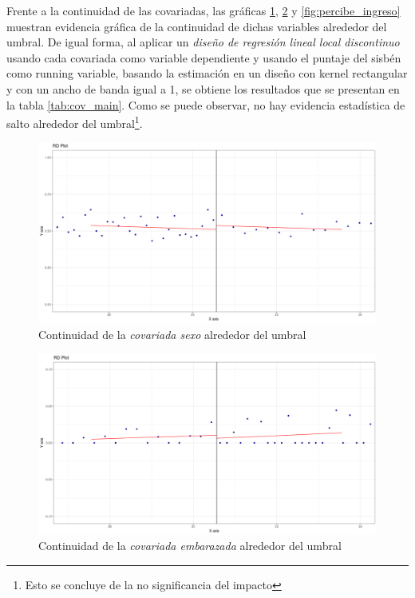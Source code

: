 \documentclass[AER]{AEA}
\begin{document}
Frente a la continuidad de las covariadas, las gráficas \ref{fig:sexo}, \ref{fig:embarazada} y \ref{fig:percibe_ingreso} muestran evidencia gráfica de la continuidad de dichas variables alrededor del umbral. De igual forma, al aplicar un \textit{diseño de regresión lineal local discontinuo} usando cada covariada como variable dependiente y usando el puntaje del sisbén como running variable, basando la estimación en un diseño con kernel rectangular y con un ancho de banda igual a 1, se obtiene los resultados que se presentan en la tabla \ref{tab:cov_main}. Como se puede observar, no hay evidencia estadística de salto alrededor del umbral\footnote{Esto se concluye de la no significancia del impacto}. 

\begin{figure}[h!]
    \centering
    \includegraphics[scale = 0.35]{imagenes/estimax_principal/sexo_main.png}
    \caption{Continuidad de la \textit{covariada sexo} alrededor del umbral}
    \label{fig:sexo}
\end{figure}

\begin{figure}[h!]
    \centering
    \includegraphics[scale = 0.35]{imagenes/estimax_principal/embarzada_main.png}
    \caption{Continuidad de la \textit{covariada embarazada} alrededor del umbral}
    \label{fig:embarazada}
\end{figure}
\end{document}
